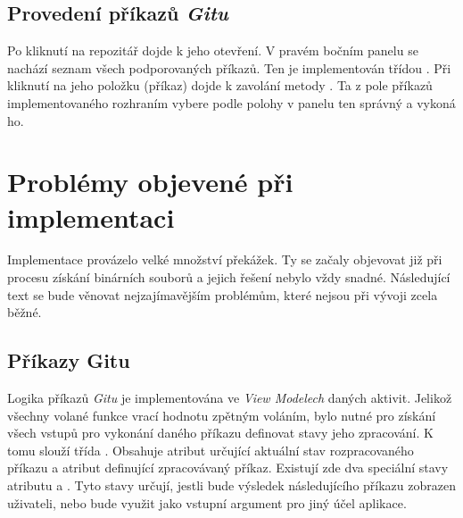     \subsection{Provedení příkazů \emph{Gitu}}
    Po kliknutí na repozitář dojde k jeho otevření. V pravém bočním panelu se nachází seznam všech podporovaných příkazů. Ten je implementován třídou . Při kliknutí na jeho položku (příkaz) dojde k zavolání metody  . Ta z pole příkazů implementovaného rozhraním  vybere podle polohy v panelu ten správný a vykoná ho.

\section{Problémy objevené při implementaci}\label{sec:problemy_implem}
Implementace provázelo velké množství překážek. Ty se začaly objevovat již při procesu získání binárních souborů a jejich řešení nebylo vždy snadné. Následující text se bude věnovat nejzajímavějším problémům, které nejsou při vývoji zcela běžné.

    \subsection{Příkazy Gitu}
    Logika příkazů \emph{Gitu} je implementována ve \emph{View Modelech} daných aktivit. Jelikož všechny volané funkce vrací hodnotu zpětným voláním, bylo nutné pro získání všech vstupů pro vykonání daného příkazu definovat stavy jeho zpracování. K tomu slouží třída . Obsahuje atribut  určující aktuální stav rozpracovaného příkazu a atribut  definující zpracovávaný příkaz. Existují zde dva speciální stavy atributu   a . Tyto stavy určují, jestli bude výsledek následujícího příkazu zobrazen uživateli, nebo bude využit jako vstupní argument pro jiný účel aplikace.

